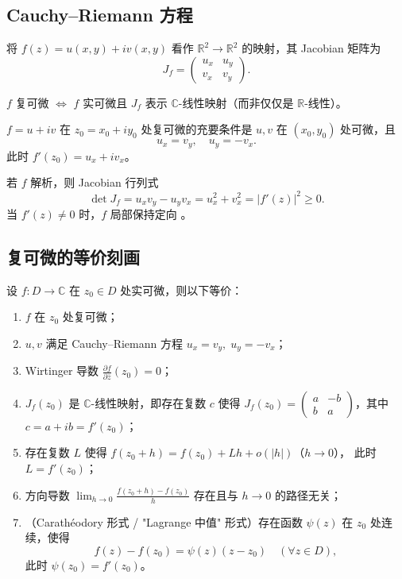 
\subsection{Cauchy--Riemann 方程}

将 $f(z) = u(x,y) + iv(x,y)$ 看作 $\mathbb{R}^2 \to \mathbb{R}^2$ 的映射，其 Jacobian 矩阵为
\[
  J_f = \begin{pmatrix} u_x & u_y \\ v_x & v_y \end{pmatrix}.
\]

$f$ 复可微 $\Longleftrightarrow$ $f$ 实可微且 $J_f$ 表示 $\mathbb{C}$-线性映射（而非仅仅是 $\mathbb{R}$-线性）。

\begin{theorem}
$f = u + iv$ 在 $z_0 = x_0 + iy_0$ 处复可微的充要条件是 $u, v$ 在 $(x_0, y_0)$ 处可微，且
\[
  u_x = v_y, \quad u_y = -v_x.
\]
此时 $f'(z_0) = u_x + iv_x$。
\end{theorem}

\begin{corollary}
若 $f$ 解析，则 Jacobian 行列式
\[
  \det J_f = u_x v_y - u_y v_x = u_x^2 + v_x^2 = |f'(z)|^2 \geq 0.
\]
当 $f'(z) \neq 0$ 时，$f$ 局部保持定向 。
\end{corollary}

\subsection{复可微的等价刻画}

\begin{theorem}[复可微的等价条件]
设 $f: D \to \mathbb{C}$ 在 $z_0 \in D$ 处实可微，则以下等价：
\begin{enumerate}
  \item $f$ 在 $z_0$ 处复可微；
  \item $u, v$ 满足 Cauchy--Riemann 方程 $u_x = v_y,\; u_y = -v_x$；
  \item Wirtinger 导数 $\displaystyle\frac{\partial f}{\partial \bar{z}}(z_0) = 0$；
  \item $J_f(z_0)$ 是 $\mathbb{C}$-线性映射，即存在复数 $c$ 使得
    $J_f(z_0) = \begin{pmatrix} a & -b \\ b & a \end{pmatrix}$，其中 $c = a + ib = f'(z_0)$；
  \item 存在复数 $L$ 使得 $f(z_0 + h) = f(z_0) + Lh + o(|h|)$（$h \to 0$），
    此时 $L = f'(z_0)$；
  \item 方向导数 $\lim_{h \to 0} \frac{f(z_0+h)-f(z_0)}{h}$ 存在且与 $h \to 0$ 的路径无关；
  \item （Carathéodory 形式 / "Lagrange 中值" 形式）存在函数 $\psi(z)$ 在 $z_0$ 处连续，使得
    \[
      f(z) - f(z_0) = \psi(z)(z - z_0) \quad (\forall z \in D),
    \]
    此时 $\psi(z_0) = f'(z_0)$。
\end{enumerate}
\end{theorem}

